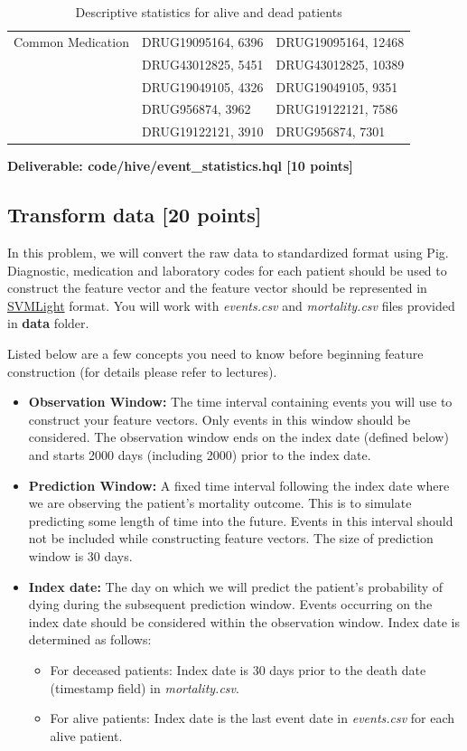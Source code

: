 \documentclass[12pt]{article}
\begin{document}
\begin{table}[h]
\begin{tabular}{@{}l|l|l}
Common Medication & DRUG19095164, 6396 & DRUG19095164, 12468 \\
 & DRUG43012825, 5451 & DRUG43012825, 10389 \\
 & DRUG19049105, 4326 & DRUG19049105, 9351 \\
 & DRUG956874, 3962 & DRUG19122121, 7586 \\
 & DRUG19122121, 3910 & DRUG956874, 7301 \\ 
\bottomrule
\end{tabular}
\caption{Descriptive statistics for alive and dead patients\label{tbl:stat}}
\end{table} 

\textbf{Deliverable: code/hive/event\_statistics.hql [10 points]}

\subsection{Transform data [20 points]}
In this problem, we will convert the raw data to standardized format using Pig. Diagnostic, medication and laboratory codes for each patient should be used to construct the feature vector and the feature vector should be represented in \href{http://svmlight.joachims.org/}{SVMLight} format. You will work with \textit{events.csv} and \textit{mortality.csv} files provided in \textbf{data} folder. 

Listed below are a few concepts you need to know before beginning feature construction (for details please refer to lectures). 

\begin{itemize}
\item \textbf{Observation Window:} The time interval containing events you will use to construct your feature vectors. Only events in this window should be considered. The observation window ends on the index date (defined below) and starts 2000 days (including 2000) prior to the index date.
\item \textbf{Prediction Window:} A fixed time interval following the index date where we are observing the patient's mortality outcome. This is to simulate predicting some length of time into the future. Events in this interval should not be included while constructing feature vectors. The size of prediction window is 30 days.
\item \textbf{Index date:} The day on which we will predict the patient's probability of dying during the subsequent prediction window. Events occurring on the index date should be considered within the observation window. Index date is determined as follows:
\begin{itemize}
\item For deceased patients: Index date is 30 days prior to the death date (timestamp field) in \textit{mortality.csv}. 
\item For alive patients: Index date is the last event date in \textit{events.csv} for each alive patient. 
\end{itemize}
\end{itemize}
\end{document}
